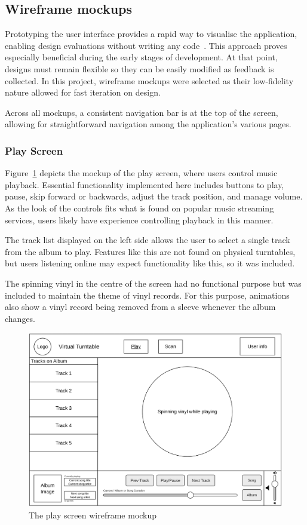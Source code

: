 \subsection{Wireframe mockups}
Prototyping the user interface provides a rapid way to visualise the application, enabling design evaluations without writing any code~\cite{WILSON1988859}. This approach proves especially beneficial during the early stages of development. At that point, designs must remain flexible so they can be easily modified as feedback is collected. In this project, wireframe mockups were selected as their low-fidelity nature allowed for fast iteration on design.

Across all mockups, a consistent navigation bar is at the top of the screen, allowing for straightforward navigation among the application's various pages.

\subsubsection{Play Screen}
Figure~\ref{fig:play_screen_mockup} depicts the mockup of the play screen, where users control music playback. Essential functionality implemented here includes buttons to play, pause, skip forward or backwards, adjust the track position, and manage volume. As the look of the controls fits what is found on popular music streaming services, users likely have experience controlling playback in this manner.

The track list displayed on the left side allows the user to select a single track from the album to play. Features like this are not found on physical turntables, but users listening online may expect functionality like this, so it was included.

The spinning vinyl in the centre of the screen had no functional purpose but was included to maintain the theme of vinyl records. For this purpose, animations also show a vinyl record being removed from a sleeve whenever the album changes.
\begin{figure} [H]
    \centering
    \includegraphics[width=0.6\linewidth]{figures/play_screen_mockup.png}
    \caption{The play screen wireframe mockup}
    \label{fig:play_screen_mockup}
\end{figure}

